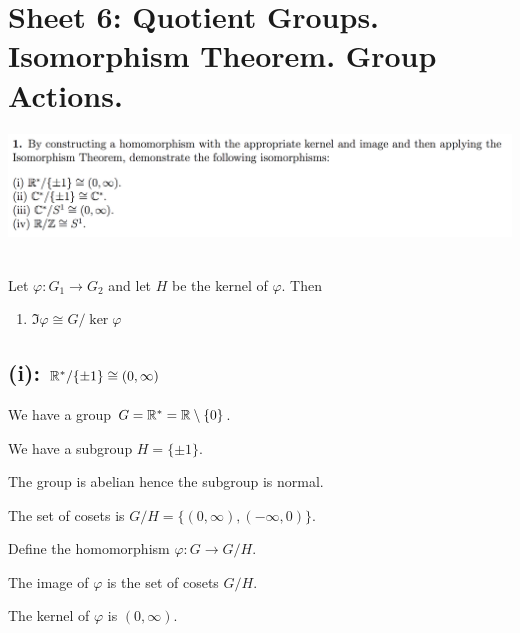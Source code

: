 \documentclass[12pt]{article}
\begin{document}
\newpage
\section{Sheet 6: Quotient Groups. Isomorphism Theorem. Group Actions.}

\begin{mdframed}
\includegraphics[width=400pt]{img/abstract-algebra-oxford-M1-6-1.png}
\end{mdframed}

\begin{theorem*}~\\
  Let $\varphi:G_1 \to G_2$ and let $H$ be the kernel of $\varphi$. Then
  \begin{enumerate}
  \item $\Im \varphi \cong G/ \ker \varphi$
  \end{enumerate}
\end{theorem*}

\subsection*{(i): $\mathbb{R}^*/\{\pm 1\} \cong (0, \infty)$}

We have a group $G = \mathbb{R}^* = \mathbb{R}\setminus\{0\}$.

We have a subgroup $H = \{\pm 1\}$.

The group is abelian hence the subgroup is normal.

The set of cosets is $G/H = \{(0, \infty), (-\infty, 0)\}$.

Define the homomorphism $\varphi: G \to G/H$.

The image of $\varphi$ is the set of cosets $G/H$.

The kernel of $\varphi$ is $(0, \infty)$.
\end{document}
